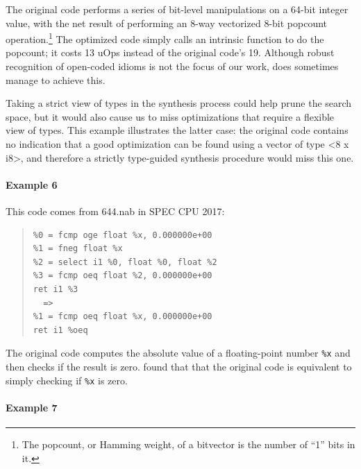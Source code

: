 %
%
The original code performs a series of bit-level
manipulations on a 64-bit integer value, with the net result of
performing an 8-way vectorized 8-bit popcount operation.\footnote{The
popcount, or Hamming weight, of a bitvector is the number of ``1''
bits in it.}
%
The optimized code simply calls an intrinsic function to do the
popcount; it costs 13 uOps instead of the original code's 19.
%
Although robust recognition of open-coded idioms is not the focus
of our work, \minotaur{} does sometimes manage to achieve this.

Taking a strict view of types in the synthesis process could help
prune the search space, but it would also cause us to miss
optimizations that require a flexible view of types.
%
This example illustrates the latter case: the original code contains
no indication that a good optimization can be found using a vector of
type <8 x i8>, and therefore a strictly type-guided synthesis
procedure would miss this one.

\paragraph*{Example 6}

This code comes from 644.nab in SPEC CPU 2017:

{\begin{quote}\begin{verbatim}
%0 = fcmp oge float %x, 0.000000e+00
%1 = fneg float %x
%2 = select i1 %0, float %0, float %2
%3 = fcmp oeq float %2, 0.000000e+00
ret i1 %3
  =>
%1 = fcmp oeq float %x, 0.000000e+00
ret i1 %oeq
\end{verbatim}
\end{quote}}

The original code computes the absolute value of a floating-point
number \texttt{\%x} and then checks if the result is zero.
\minotaur{} found that that the original code is equivalent to simply checking if
\texttt{\%x} is zero.


\paragraph*{Example 7}

